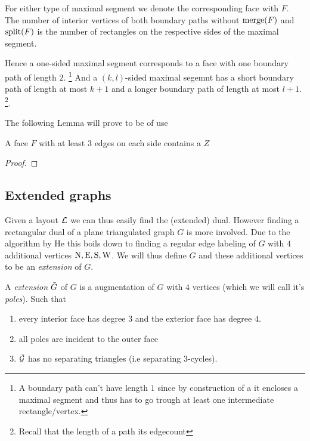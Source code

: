   For either type of maximal segment we denote the corresponding face with $F$. The number of interior vertices of both boundary paths without $\operatorname{merge}(F)$ and $\operatorname{split}(F)$ is the number of rectangles on the respective sides of the maximal segment.

  Hence a one-sided maximal segment corresponds to a face with one boundary path of length $2$. \footnote{A boundary path can't have length $1$ since by construction of a \rel it encloses a maximal segment and thus has to go trough at least one intermediate rectangle/vertex.} And a $(k,l)$-sided maximal segemnt has a short boundary path of length at most $k+1$ and a longer boundary path of length at most $l+1$. \footnote{Recall that the length of a path its edgecount}.

  The following Lemma will prove to be of use
  \begin{lemma}
  \label{lm:zInRedFace}
  A face $F$ with at least $3$ edges on each side contains a $Z$
  \end{lemma}
  \begin{proof}
  \end{proof}


\subsection{Extended graphs}
  Given a layout $\mathcal{L}$ we can thus easily find the (extended) dual. However finding a rectangular dual of a plane triangulated graph $G$ is more involved. Due to the algorithm by He \cite{He} this boils down to finding a regular edge labeling of $G$ with $4$ additional vertices $\mathrm{N}, \mathrm{E}, \mathrm{S}, \mathrm{W}$. We will thus define $G$ and these additional vertices to be an \emph{extension} of $G$.

  \begin{defi}[Extension]
    A \emph{extension} $\bar{G}$ of $G$ is a augmentation of $G$ with $4$ vertices (which we will call it's \emph{poles}). Such that
    \begin{enumerate}
    \item every interior face has degree $3$ and the exterior face has degree $4$.
    \item all poles are incident to the outer face
    \item $\bar{\mathcal{G}}$ has no separating triangles (i.e separating $3$-cycles).
    \end{enumerate}
  \end{defi}

